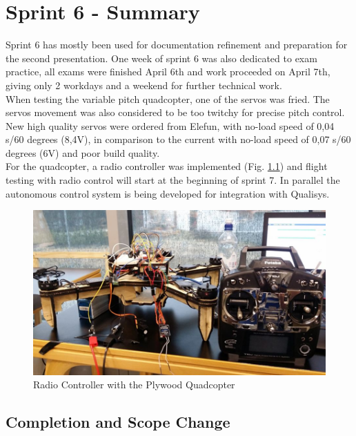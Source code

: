 \chapter{Sprint 6 - Summary}
Sprint 6 has mostly been used for documentation refinement and preparation for the second presentation. One week of sprint 6 was also dedicated to exam practice, all exams were finished April 6th and work proceeded on April 7th, giving only 2 workdays and a weekend for further technical work.  \\

When testing the variable pitch quadcopter, one of the servos was fried. The servos movement was also considered to be too twitchy for precise pitch control. New high quality servos were ordered from Elefun, with no-load speed of 0,04 s/60 degrees (8,4V), in comparison to the current with no-load speed of 0,07 s/60 degrees (6V) and poor build quality. \\
 
For the quadcopter, a radio controller was implemented (Fig. \ref{fig:radio}) and flight testing with radio control will start at the beginning of sprint 7. In parallel the autonomous control system is being developed for integration with Qualisys. 

\begin{figure}[H]
    \centering
         \includegraphics[width = 1\textwidth]{VAPIQ-PICTURES/radiocontroller}
      \caption{Radio Controller with the Plywood Quadcopter}
    \label{fig:radio}
\end{figure} 



\clearpage

\section{Completion and Scope Change}

